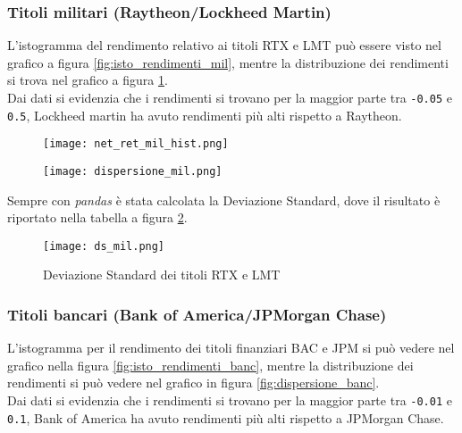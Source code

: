 \subsubsection{Titoli militari (Raytheon/Lockheed Martin)}

L'istogramma del rendimento relativo ai titoli RTX e LMT può essere visto nel grafico a figura \ref{fig:isto_rendimenti_mil}, mentre la distribuzione dei rendimenti
si trova nel grafico a figura \ref{fig:dispersione_mil}.\\
Dai dati si evidenzia che i rendimenti si trovano per la maggior parte tra \verb|-0.05| e \verb|0.5|, Lockheed martin ha avuto rendimenti più alti rispetto
a Raytheon.

\begin{figure}[h]
  \centering
  \begin{minipage}{.5\textwidth}
    \centering
    \texttt{[image: net\_ret\_mil\_hist.png]}
    \label{fig:isto_rendimenti_mil}
  \end{minipage}%
  \begin{minipage}{.5\textwidth}
    \centering
    \texttt{[image: dispersione\_mil.png]}
    \label{fig:dispersione_mil}
  \end{minipage}
\end{figure}

Sempre con \emph{pandas} è stata calcolata la Deviazione Standard, dove il risultato è riportato nella tabella a figura \ref{fig:ds_mil}.

\begin{figure}[h]
  \centering
  \texttt{[image: ds\_mil.png]}
  \caption{Deviazione Standard dei titoli RTX e LMT}
  \label{fig:ds_mil}
\end{figure}

\pagebreak

\subsubsection{Titoli bancari (Bank of America/JPMorgan Chase)}

L'istogramma per il rendimento dei titoli finanziari BAC e JPM si può vedere nel grafico nella figura \ref{fig:isto_rendimenti_banc}, mentre la distribuzione dei rendimenti
si può vedere nel grafico in figura \ref{fig:dispersione_banc}.\\
Dai dati si evidenzia che i rendimenti si trovano per la maggior parte tra \verb|-0.01| e \verb|0.1|, Bank of America ha avuto rendimenti più alti
rispetto a JPMorgan Chase.

